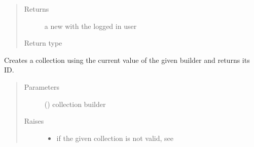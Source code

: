\documentclass[letterpaper,10pt,english]{sphinxmanual}
\begin{document}
\begin{fulllineitems}
\begin{fulllineitems}
\begin{quote}
\begin{description}
\item[{Returns}] \leavevmode
\sphinxAtStartPar
a new {\hyperref[\detokenize{autoapi/pine/client/models/index:pine.client.models.CollectionBuilder}]{}} with the logged in user

\item[{Return type}] \leavevmode
\sphinxAtStartPar
{\hyperref[\detokenize{autoapi/pine/client/models/index:pine.client.models.CollectionBuilder}]{}}

\end{description}\end{quote}

\end{fulllineitems}


\begin{fulllineitems}
\label{\detokenize{autoapi/pine/client/client/index:pine.client.client.PineClient.create_collection}}
\sphinxAtStartPar
Creates a collection using the current value of the given builder and returns its ID.
\begin{quote}\begin{description}
\item[{Parameters}] \leavevmode
\sphinxAtStartPar
{} ({\hyperref[\detokenize{autoapi/pine/client/models/index:pine.client.models.CollectionBuilder}]{}}) \textendash{} collection builder

\item[{Raises}] \leavevmode\begin{itemize}
\item {} 
\sphinxAtStartPar
{\hyperref[\detokenize{autoapi/pine/client/exceptions/index:pine.client.exceptions.PineClientValueException}]{}} \textendash{} if the given collection is not valid, see {\hyperref[\detokenize{autoapi/pine/client/models/index:pine.client.models.is_valid_collection}]{}}


\end{itemize}
\end{description}
\end{quote}
\end{fulllineitems}
\end{fulllineitems}
\end{document}
